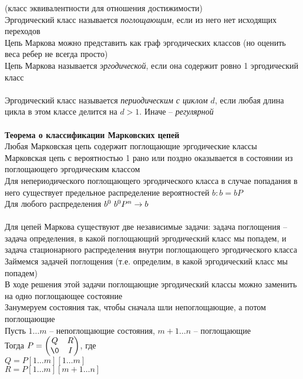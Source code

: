 \documentclass[12pt]{article}
\begin{document}
(класс эквивалентности для отношения достижимости)\\
Эргодический класс называется \textit{поглощающим}, если из него нет исходящих переходов\\
Цепь Маркова можно представить как граф эргодических классов (но оценить веса ребер не всегда просто)\\
Цепь Маркова называется \textit{эргодической}, если она содержит ровно 1 эргодический класс\\\\
Эргодический класс называется \textit{периодическим с циклом $d$}, если любая длина цикла в этом классе делится на $d > 1$. Иначе -- \textit{регулярной}\\\\
\textbf{Теорема о классификации Марковских цепей}\\
Любая Марковская цепь содержит поглощающие эргодические классы\\
Марковская цепь с вероятностью 1 рано или поздно оказывается в состоянии из поглощающего эргодическим классом\\
Для непериодического поглощающего эргодического класса в случае попадания в него существует предельное распределение вероятностей $b: b = bP$\\
Для любого распределения $b^0\ b^0P^n \rightarrow b$\\\\
Для цепей Маркова существуют две независимые задачи: задача поглощения -- задача определения, в какой поглощающий эргодический класс мы попадем, и задача стационарного распределения внутри поглощающего эргодического класса\\
Займемся задачей поглощения (т.е. определим, в какой эргодический класс мы попадем)\\
В ходе решения этой задачи поглощающие эргодический классы можно заменить на одно поглощающее состояние\\
Занумеруем состояния так, чтобы сначала шли непоглощающие, а потом поглощающие\\
Пусть $1\ldots m$ -- непоглощающие состояния, $m + 1\ldots n$ -- поглощающие\\
Тогда $P = \begin{pmatrix}
    Q & R\\
    \0 & I
\end{pmatrix}$, где \\
$Q = P[1\ldots m][1\ldots m]$\\
$R = P[1\ldots m][m+1\ldots n]$\\
\end{document}
